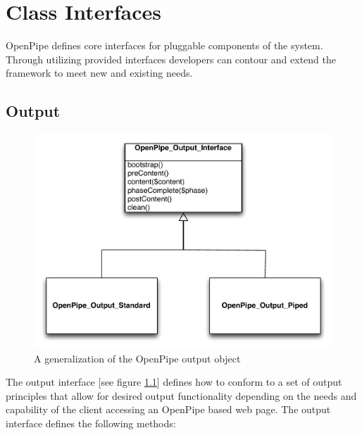 \documentclass[12pt]{report}
\begin{document}

\chapter{Class Interfaces}

OpenPipe defines core interfaces for pluggable components of the system. Through utilizing provided interfaces developers can contour and extend the framework to meet new and existing needs. 

\section{Output}

\begin{figure}[H]
\label{fig:generalizationOutput}
\centering
\includegraphics[width=\textwidth,keepaspectratio]{figures/images/generalization_output.pdf}
\caption{A generalization of the OpenPipe output object}
\end{figure}

The output interface [see figure \ref{fig:generalizationOutput}] defines how to conform to a set of output principles that allow for desired output functionality depending on the needs and capability of the client accessing an OpenPipe based web page.  The output interface defines the following methods:
\end{document}
